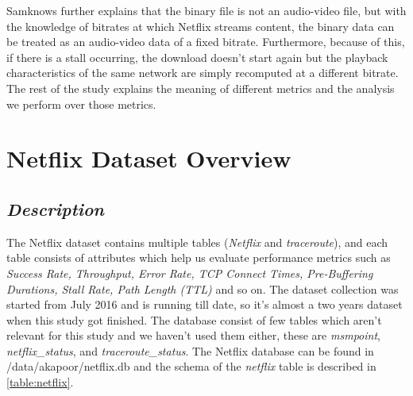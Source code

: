 Samknows \cite{samknowswhitepaper} further explains that the binary file is not an audio-video file, but with the knowledge of bitrates at which Netflix streams content, the binary data can be
treated as an audio-video data of a fixed bitrate. Furthermore, because of this, if there is a stall occurring, the download doesn't start again but the playback characteristics of the same network are simply recomputed at a different bitrate. The rest of the study explains the meaning of different metrics and the analysis we perform over those metrics.

\FloatBarrier

\section{Netflix Dataset Overview}\label{section:netflix-dataset}

\subsection*{\textit{Description}}

The Netflix dataset contains multiple tables (\textit{Netflix} and \textit{traceroute}), and each table consists of attributes which help us evaluate performance metrics such as \textit{Success Rate, Throughput, Error Rate, TCP Connect Times, Pre-Buffering Durations, Stall Rate, Path Length (TTL)} and so on.  The dataset collection was started from July 2016 and is running till date, so it's almost a two years dataset when this study got finished. The database consist of few tables which aren't relevant for this study and we haven't used them either, these are \textit{msmpoint}, \textit{netflix\_status}, and \textit{traceroute\_status}. The Netflix database can be found in /data/akapoor/netflix.db and the schema of the \textit{netflix} table is described in \cref{table:netflix}. 

